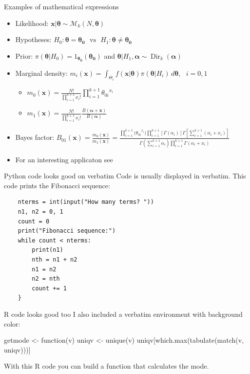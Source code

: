 \begin{frame}{Examples of mathematical expressions}
	\begin{itemize}
	\item Likelihood: $\bm{x}|\bm{\theta} \sim \mathcal{M}_k(N,\bm{\theta})$
	\item Hypotheses:  $ H_0: \bm{\theta}=\bm{\theta_0} \,\,\,\, \text{vs} \,\,\,\,  H_1: \bm{\theta} \neq \bm{\theta_0}$
	\item Prior: $\pi(\bm{\theta}|H_0)={1_{\bm{\theta_0}}(\bm{\theta_0})}$ and $\bm{\theta}|H_1, \bm{\alpha} \sim \operatorname{Dir}_k(\bm{\alpha})$ 
	\item Marginal density: $m_i(\bm{x})=\int_{\Theta_i} f(\bm{x}|\bm{\theta})\pi(\bm{\theta}|H_i) \, d\bm{\theta} $, \, $i=0,1$
		\begin{itemize}
		\item  $m_0(\bm{x})=\frac{N!}{\prod_{i=1}^{k+1}x_i!}\prod_{i=1}^{k+1}{\theta_{0i}}^{x_i}$ 
		\item  $m_1(\bm{x})= \frac{N!}{\prod_{i=1}^{k+1}x_i!}\frac{B(\bm{\alpha}+\bm{x})}{B(\bm{\alpha})}$ 
		\end{itemize}
	\item Bayes factor: $B_{01}(\bm{x}) = \frac{m_0(\bm{x})}{m_1(\bm{x})} = \frac{\prod_{i=1}^{k+1}{(\theta_{0i}}^{x_i}) \prod_{i=1}^{k+1}[\Gamma(\alpha_i)] \Gamma [\sum_{i=1}^{k+1}(\alpha_i+x_i)]}{\Gamma(\sum_{i=1}^{k+1} \alpha_i) \prod_{i=1}^{k+1}\Gamma(\alpha_i+x_i)}$
	\item For an interesting applicaton see \citet{pericchiTorres2011}
	\end{itemize}
\end{frame}

\begin{frame}[fragile]{Python code looks good on verbatim}
	Code is usually displayed in verbatim. This code prints the Fibonacci sequence:
	\begin{verbatim}
	nterms = int(input("How many terms? "))
	n1, n2 = 0, 1
	count = 0
	print("Fibonacci sequence:")
	while count < nterms:
	    print(n1)
	    nth = n1 + n2
	    n1 = n2
	    n2 = nth
	    count += 1
	}
	\end{verbatim}
\end{frame}

\begin{frame}[fragile]{R code looks good too}
	I also included a verbatim environment with background color:
	\begin{cverbatim}
getmode <- function(v) {
	uniqv <- unique(v)
	uniqv[which.max(tabulate(match(v, uniqv)))]
	}
	\end{cverbatim}
	With this R code you can build a function that calculates the mode.
\end{frame}



















